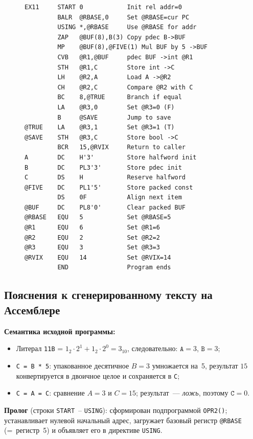 \documentclass[a4paper,14pt]{extarticle}
\begin{document}
\begin{figure}[H]
\begin{lstlisting}[style=ASMstyle,caption={Полученный ассемблерный эквивалент \texttt{ex11.ass}},label=lst:result_asm]
EX11     START 0            Init rel addr=0
         BALR  @RBASE,0     Set @RBASE=cur PC
         USING *,@RBASE     Use @RBASE for addr
         ZAP   @BUF(8),B(3) Copy pdec B->BUF
         MP    @BUF(8),@FIVE(1) Mul BUF by 5 ->BUF
         CVB   @R1,@BUF     pdec BUF ->int @R1
         STH   @R1,C        Store int ->C
         LH    @R2,A        Load A ->@R2
         CH    @R2,C        Compare @R2 with C
         BC    8,@TRUE      Branch if equal
         LA    @R3,0        Set @R3=0 (F)
         B     @SAVE        Jump to save
@TRUE    LA    @R3,1        Set @R3=1 (T)
@SAVE    STH   @R3,C        Store bool ->C
         BCR   15,@RVIX     Return to caller
A        DC    H'3'         Store halfword init
B        DC    PL3'3'       Store pdec init
C        DS    H            Reserve halfword
@FIVE    DC    PL1'5'       Store packed const
         DS    0F           Align next item
@BUF     DC    PL8'0'       Clear packed BUF
@RBASE   EQU   5            Set @RBASE=5
@R1      EQU   6            Set @R1=6
@R2      EQU   2            Set @R2=2
@R3      EQU   3            Set @R3=3
@RVIX    EQU   14           Set @RVIX=14
         END                Program ends
\end{lstlisting}
\end{figure}

\subsection*{Пояснения к сгенерированному тексту на Ассемблере}

\textbf{Семантика исходной программы:}
\begin{itemize}
  \item Литерал \texttt{11B} = $1_2 \cdot 2^1 + 1_2 \cdot 2^0 = 3_{10}$, следовательно:
        $\texttt{A} = 3$, $\texttt{B} = 3$;
  \item \texttt{C = B * 5}: упакованное десятичное $B=3$ умножается на~5,
        результат $15$ конвертируется в двоичное целое и сохраняется в \texttt{C};
  \item \texttt{C = A = C}: сравнение $A=3$ и $C=15$; результат~--- \textit{ложь},
        поэтому $\texttt{C} = 0$.
\end{itemize}

\textbf{Пролог} (строки \texttt{START}~– \texttt{USING}): сформирован подпрограммой
\texttt{OPR2()}; устанавливает нулевой начальный адрес, загружает базовый регистр
\texttt{@RBASE} (=~регистр~5) и объявляет его в директиве \texttt{USING}.
\end{document}
